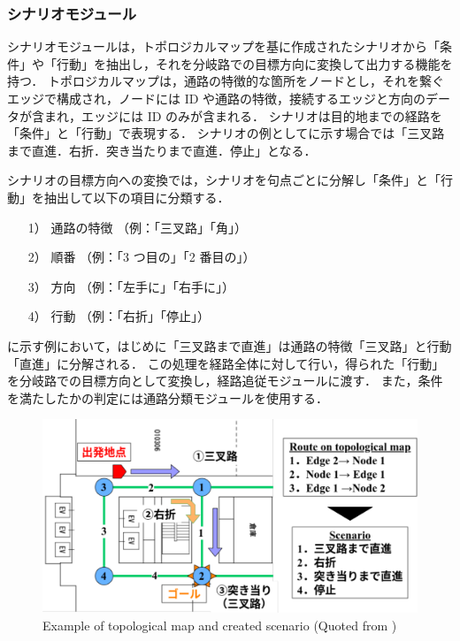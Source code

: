 \subsubsection{シナリオモジュール}
シナリオモジュールは，トポロジカルマップを基に作成されたシナリオから「条件」や「行動」を抽出し，それを分岐路での目標方向に変換して出力する機能を持つ．
トポロジカルマップは，通路の特徴的な箇所をノードとし，それを繋ぐエッジで構成され，ノードには ID や通路の特徴，接続するエッジと方向のデータが含まれ，エッジには ID のみが含まれる．
シナリオは目的地までの経路を「条件」と「行動」で表現する．
シナリオの例としてに示す場合では「三叉路まで直進．右折．突き当たりまで直進．停止」となる．

シナリオの目標方向への変換では，シナリオを句点ごとに分解し「条件」と「行動」を抽出して以下の項目に分類する．
\begin{enumerate}
  \item [1）] 通路の特徴 （例：「三叉路」「角」）
  \item [2）] 順番 （例：「3 つ目の」「2 番目の」） 
  \item [3）] 方向 （例：「左手に」「右手に」）
  \item [4）] 行動 （例：「右折」「停止」）
\end{enumerate}

に示す例において，はじめに「三叉路まで直進」は通路の特徴「三叉路」と行動「直進」に分解される．
この処理を経路全体に対して行い，得られた「行動」を分岐路での目標方向として変換し，経路追従モジュールに渡す．
また，条件を満たしたかの判定には通路分類モジュールを使用する．

\begin{figure}[htbp]
  \centering
   \includegraphics[width=130mm]{images/pdf/haruyama/scenario.pdf}
   \caption[Example of topological map and created scenario]{Example of topological map and created scenario (Quoted from \cite{haruyama2023})}
   \label{fig:scenario}
\end{figure}

